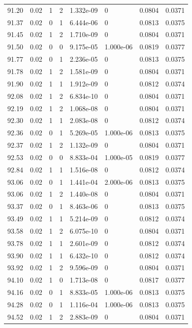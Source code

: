 \documentclass[preview]{standalone}
\begin{document}
{{{{{{{{{{{{{{\begin{tabular}{L{1.2cm}C{1.2cm} C{0.3cm}C{0.5cm} C{1.4cm}C{1.4cm} C{1.4cm}C{1.4cm}}
  91.20  &  0.02  & 1     &  2 &  1.332e-09  & 0  & 0.0804 &  0.0371   \\ 
  91.37  &  0.02  & 0     &  1 &  6.444e-06  & 0  & 0.0813 &  0.0375   \\ 
  91.45  &  0.02  & 1     &  2 &  1.710e-09  & 0  & 0.0804 &  0.0371   \\ 
  91.50  &  0.02  & 0     &  0 &  9.175e-05  & 1.000e-06  & 0.0819 &  0.0377   \\ 
  91.77  &  0.02  & 0     &  1 &  2.236e-05  & 0  & 0.0813 &  0.0375   \\ 
  91.78  &  0.02  & 1     &  2 &  1.581e-09  & 0  & 0.0804 &  0.0371   \\ 
  91.90  &  0.02  & 1     &  1 &  1.912e-09  & 0  & 0.0812 &  0.0374   \\ 
  92.08  &  0.02  & 1     &  2 &  6.834e-10  & 0  & 0.0804 &  0.0371   \\ 
  92.19  &  0.02  & 1     &  2 &  1.068e-08  & 0  & 0.0804 &  0.0371   \\ 
  92.30  &  0.02  & 1     &  1 &  2.083e-08  & 0  & 0.0812 &  0.0374   \\ 
  92.36  &  0.02  & 0     &  1 &  5.269e-05  & 1.000e-06  & 0.0813 &  0.0375   \\ 
  92.37  &  0.02  & 1     &  2 &  1.132e-09  & 0  & 0.0804 &  0.0371   \\ 
  92.53  &  0.02  & 0     &  0 &  8.833e-04  & 1.000e-05  & 0.0819 &  0.0377   \\ 
  92.84  &  0.02  & 1     &  1 &  1.516e-08  & 0  & 0.0812 &  0.0374   \\ 
  93.06  &  0.02  & 0     &  1 &  1.441e-04  & 2.000e-06  & 0.0813 &  0.0375   \\ 
  93.06  &  0.02  & 1     &  2 &  1.440e-08  & 0  & 0.0804 &  0.0371   \\ 
  93.37  &  0.02  & 0     &  1 &  8.463e-06  & 0  & 0.0813 &  0.0375   \\ 
  93.49  &  0.02  & 1     &  1 &  5.214e-09  & 0  & 0.0812 &  0.0374   \\ 
  93.58  &  0.02  & 1     &  2 &  6.075e-10  & 0  & 0.0804 &  0.0371   \\ 
  93.78  &  0.02  & 1     &  1 &  2.601e-09  & 0  & 0.0812 &  0.0374   \\ 
  93.90  &  0.02  & 1     &  1 &  6.432e-10  & 0  & 0.0812 &  0.0374   \\ 
  93.92  &  0.02  & 1     &  2 &  9.596e-09  & 0  & 0.0804 &  0.0371   \\ 
  94.10  &  0.02  & 1     &  0 &  1.713e-08  & 0  & 0.0817 &  0.0377   \\ 
  94.16  &  0.02  & 0     &  1 &  8.833e-05  & 1.000e-06  & 0.0813 &  0.0375   \\ 
  94.28  &  0.02  & 0     &  1 &  1.116e-04  & 1.000e-06  & 0.0813 &  0.0375   \\ 
  94.52  &  0.02  & 1     &  2 &  2.883e-09  & 0  & 0.0804 &  0.0371   \\ 
\hline 
\end{tabular} 

}}}}}}}}}}}}}}
\end{document}
